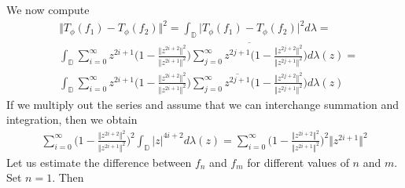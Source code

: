 \documentclass[12pt]{article}
\begin{document}
We now compute
\begin{align}
&\Vert T_\phi(f_1) - T_\phi(f_2) \Vert^2 = \int_\mathbb{D} \vert T_\phi(f_1) - T_\phi(f_2) \vert^2 d\lambda = \\
&\int_\mathbb{D} \sum_{i=0}^\infty z^{2i+1}\bigg(1-\frac{\Vert z^{2i+2}\Vert^2}{\Vert z^{2i+1}\Vert^2}\bigg) \overline{\sum_{j=0}^\infty z^{2j+1}\bigg(1-\frac{\Vert z^{2j+2}\Vert^2}{\Vert z^{2j+1}\Vert^2}\bigg)} d\lambda(z) =\\
&  \int_\mathbb{D} \sum_{i=0}^\infty z^{2i+1}\bigg(1-\frac{\Vert z^{2i+2}\Vert^2}{\Vert z^{2i+1}\Vert^2}\bigg) \sum_{j=0}^\infty \overline{z^{2j+1}}\bigg(1-\frac{\Vert z^{2j+2}\Vert^2}{\Vert z^{2j+1}\Vert^2}\bigg) d\lambda(z)
\end{align} If we multiply out the series and assume that we can interchange summation and integration, then we obtain
\begin{align}
\sum_{i=0}^\infty \bigg(1-\frac{\Vert z^{2i+2}\Vert^2}{\Vert z^{2i+1}\Vert^2}\bigg)^2 \int_{\mathbb{D}} \vert z \vert^{4i+2} d\lambda(z) = \sum_{i=0}^\infty \bigg(1-\frac{\Vert z^{2i+2}\Vert^2}{\Vert z^{2i+1}\Vert^2}\bigg)^2 \Vert z^{2i+1} \Vert^2
\end{align} Let us estimate the difference between $f_n$ and $f_m$ for different values of $n$ and $m$. Set $n = 1$. Then
\end{document}
